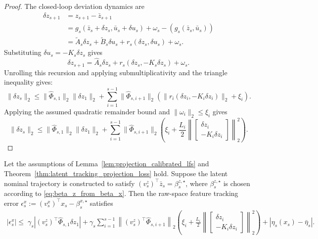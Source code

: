\documentclass{article}
\begin{document}
\begin{proof}
The closed-loop deviation dynamics are
\[
\begin{aligned}
    \delta z_{s+1}
    &=
    z_{s+1}-\bar z_{s+1} \\
    &=
    g_s(\bar z_s+\delta z_s,\bar u_s+\delta u_s)
    +\omega_s
    -
    \left(g_s(\bar z_s,\bar u_s)\right)\\
    &=
    \tilde A_s\delta z_s+\tilde B_s\delta u_s
    +
    r_s(\delta z_s,\delta u_s)
    +
    \omega_s.
\end{aligned}
\]
Substituting $\delta u_s=-K_s\delta z_s$ gives
\[
    \delta z_{s+1}
    =
    \widehat A_s\delta z_s
    +
    r_s(\delta z_s,-K_s\delta z_s)
    +
    \omega_s.
\]
Unrolling this recursion and applying submultiplicativity and the
triangle inequality gives:
\begin{equation}
    \|\delta z_s\|_2
    \le
    \|\widehat\Phi_{s,1}\|_2\|\delta z_1\|_2
    +
    \sum_{i=1}^{s-1}
    \|\widehat\Phi_{s,i+1}\|_2
    \left(
    \|r_i(\delta z_i,-K_i\delta z_i)\|_2
    +
    \xi_i
    \right).
\end{equation}
Applying the assumed
quadratic remainder bound and $\|\omega_i\|_2\le \xi_i$ gives
\begin{equation}
    \|\delta z_s\|_2
    \le
    \|\widehat\Phi_{s,1}\|_2\|\delta z_1\|_2
    +
    \sum_{i=1}^{s-1}
    \|\widehat\Phi_{s,i+1}\|_2
    \left(
    \xi_i
    +
    \frac{L_i}{2}
    \left\|
    \begin{bmatrix}
    \delta z_i\\
    -K_i\delta z_i
    \end{bmatrix}
    \right\|_2^2
    \right).
\end{equation}

\end{proof}

\begin{corollary}
\label{cor:app_raw_lfs_tracking_latent_lqr}
Let the assumptions of Lemma~\ref{lem:projection_calibrated_lfs} and
Theorem~\ref{thm:latent_tracking_projection_loss} hold. Suppose the
latent nominal trajectory is constructed to satisfy
$(v^z_s)^\top \bar z_s = \beta^{z,\star}_s$, 
where $\beta^{z,\star}_s$ is chosen according to
\eqref{eq:beta_z_from_beta_x}. Then the raw-space feature tracking
error $\epsilon^x_s
    :=
    (v^x_s)^\top x_s-\beta^{x,\star}_s$
satisfies
\[
\begin{aligned}
    |\epsilon^x_s|
    \le\;
    \gamma_s
    \left|
    (v^z_s)^\top \widehat\Phi_{s,1}\delta z_1
    \right|
    +
    \gamma_s
    \sum_{i=1}^{s-1}
    \left\|
    (v^z_s)^\top \widehat\Phi_{s,i+1}
    \right\|_2
    \left(
    \xi_i
    +
    \frac{L_i}{2}
    \left\|
    \begin{bmatrix}
    \delta z_i\\
    -K_i\delta z_i
    \end{bmatrix}
    \right\|_2^2
    \right)
    +
    \left|
    \eta_s(x_s)-\bar\eta_s
    \right|.
\end{aligned}
\label{eq:raw_lfs_tracking_bound}
\]
\end{corollary}
\end{document}

